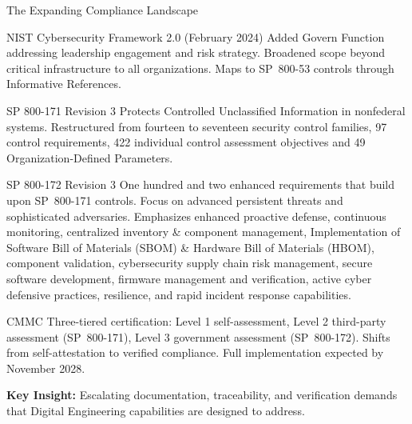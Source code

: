 \documentclass{beamer}
\begin{document}
\begin{frame}[allowframebreaks]{The Expanding Compliance Landscape}
  \begin{block}{NIST Cybersecurity Framework 2.0 (February 2024)}
    Added Govern Function addressing leadership engagement and risk strategy. Broadened scope beyond critical infrastructure to all organizations. Maps to SP~800-53 controls through Informative References.
  \end{block}

  \begin{block}{SP 800-171 Revision 3}
    Protects Controlled Unclassified Information in nonfederal systems. Restructured from fourteen to seventeen security control families, 97 control requirements, 422 individual control assessment objectives and 49 Organization-Defined Parameters.
  \end{block}

  \vspace{1.0cm}

  \begin{block}{SP 800-172 Revision 3}
    One hundred and two enhanced requirements that build upon SP~800-171 controls. Focus on advanced persistent threats and sophisticated adversaries. Emphasizes enhanced proactive defense, continuous monitoring, centralized inventory \& component management, Implementation of Software Bill of Materials (SBOM) \& Hardware Bill of Materials (HBOM), component validation, cybersecurity supply chain risk management, secure software development, firmware management and verification, active cyber defensive practices, resilience, and rapid incident response capabilities.
  \end{block}

  \vspace{1.0cm}

  \begin{block}{CMMC}
    Three-tiered certification: Level 1 self-assessment, Level 2 third-party assessment (SP~800-171), Level 3 government assessment (SP~800-172). Shifts from self-attestation to verified compliance. Full implementation expected by November 2028.
  \end{block}

  \vspace{0.2cm}
  \textbf{Key Insight:} Escalating documentation, traceability, and verification demands that Digital Engineering capabilities are designed to address.
\end{frame}
\end{document}
